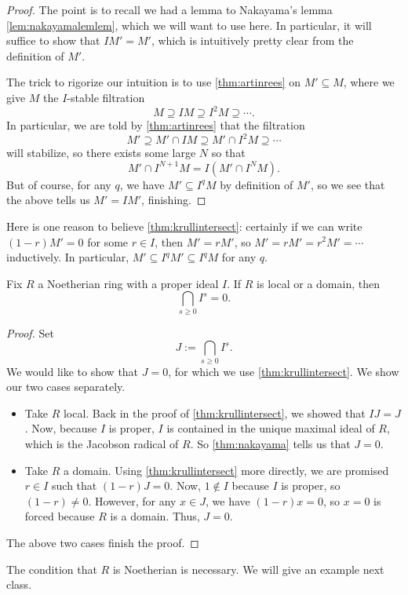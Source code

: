\begin{proof}
	The point is to recall we had a lemma to Nakayama's lemma \autoref{lem:nakayamalemlem}, which we will want to use here. In particular, it will suffice to show that $IM'=M'$, which is intuitively pretty clear from the definition of $M'$.

	The trick to rigorize our intuition is to use \autoref{thm:artinrees} on $M'\subseteq M$, where we give $M$ the $I$-stable filtration
	\[M\supseteq IM\supseteq I^2M\supseteq\cdots.\]
	In particular, we are told by \autoref{thm:artinrees} that the filtration
	\[M'\supseteq M'\cap IM\supseteq M'\cap I^2M\supseteq\cdots\]
	will stabilize, so there exists some large $N$ so that
	\[M'\cap I^{N+1}M=I\left(M'\cap I^NM\right).\]
	But of course, for any $q$, we have $M'\subseteq I^qM$ by definition of $M'$, so we see that the above tells us $M'=IM'$, finishing.
\end{proof}
\begin{remark}[Nir]
	Here is one reason to believe \autoref{thm:krullintersect}: certainly if we can write $(1-r)M'=0$ for some $r\in I$, then $M'=rM'$, so $M'=rM'=r^2M'=\cdots$ inductively. In particular, $M'\subseteq I^qM'\subseteq I^qM$ for any $q$.
\end{remark}
\begin{corollary} \label{cor:krullintersect}
	Fix $R$ a Noetherian ring with a proper ideal $I$. If $R$ is local or a domain, then
	\[\bigcap_{s\ge0}I^s=0.\]
\end{corollary}
\begin{proof}
	Set
	\[J:=\bigcap_{s\ge0}I^s.\]
	We would like to show that $J=0$, for which we use \autoref{thm:krullintersect}. We show our two cases separately.
	\begin{itemize}
		\item Take $R$ local. Back in the proof of \autoref{thm:krullintersect}, we showed that $IJ=J$. Now, because $I$ is proper, $I$ is contained in the unique maximal ideal of $R$, which is the Jacobson radical of $R$. So \autoref{thm:nakayama} tells us that $J=0$.
		\item Take $R$ a domain. Using \autoref{thm:krullintersect} more directly, we are promised $r\in I$ such that $(1-r)J=0$. Now, $1\notin I$ because $I$ is proper, so $(1-r)\ne0$. However, for any $x\in J$, we have $(1-r)x=0$, so $x=0$ is forced because $R$ is a domain. Thus, $J=0$.
	\end{itemize}
	The above two cases finish the proof.
\end{proof}
\begin{remark}
	The condition that $R$ is Noetherian is necessary. We will give an example next class.
\end{remark}
